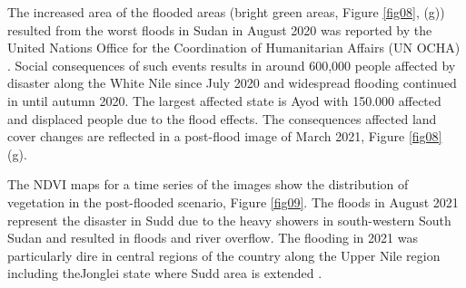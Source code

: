 \documentclass[analytics,article,submit,pdftex,moreauthors]{Definitions/mdpi}
\begin{document}
The increased area of the flooded areas (bright green areas, Figure \ref{fig08}, (g)) resulted from the worst floods in Sudan in August 2020 was reported by the United Nations Office for the Coordination of Humanitarian Affairs (UN OCHA) \cite{OCHA2020}. Social consequences of such events results in around 600,000 people affected by disaster along the White Nile since July 2020 and widespread flooding continued in until autumn 2020. The largest affected state is Ayod with 150.000 affected and displaced people due to the flood effects. The consequences affected land cover changes are reflected in a post-flood image of March 2021, Figure \ref{fig08} (g). 

The NDVI maps for a time series of the images show the distribution of vegetation in the post-flooded scenario, Figure \ref{fig09}. The floods in August 2021 represent the disaster in Sudd due to the heavy showers in south-western South Sudan and resulted in floods and river overflow. The flooding in 2021 was particularly dire in central regions of the country along the Upper Nile region including theJonglei state where Sudd area is extended \cite{SouthSudan2021}. 
\end{document}
